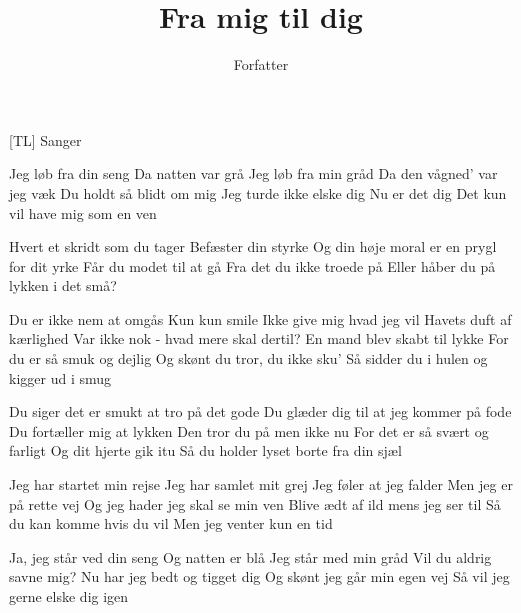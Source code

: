 \documentclass[a4paper,11pt]{article}
\title{Fra mig til dig}
\author{Forfatter}
\begin{document}
\maketitle

\begin{roles}
[TL] Sanger
\end{roles}

\begin{song}

 Jeg løb fra din seng
  Da natten var grå
  Jeg løb fra min gråd
  Da den vågned' var jeg væk
  Du holdt så blidt om mig
  Jeg turde ikke elske dig
  Nu er det dig
  Det kun vil have mig som en ven

 Hvert et skridt som du tager
  Befæster din styrke
  Og din høje moral er en prygl for dit yrke
  Får du modet til at gå
  Fra det du ikke troede på
  Eller håber du på lykken i det små?

 Du er ikke nem at omgås
  Kun kun smile
  Ikke give mig hvad jeg vil
  Havets duft af kærlighed
  Var ikke nok - hvad mere skal dertil?
  En mand blev skabt til lykke
  For du er så smuk og dejlig
  Og skønt du tror, du ikke sku'
  Så sidder du i hulen og kigger ud i smug

 Du siger det er smukt at tro på det gode
  Du glæder dig til at jeg kommer på fode
  Du fortæller mig at lykken
  Den tror du på men ikke nu
  For det er så svært og farligt
  Og dit hjerte gik itu
  Så du holder lyset borte fra din sjæl

 Jeg har startet min rejse
  Jeg har samlet mit grej
  Jeg føler at jeg falder
  Men jeg er på rette vej
  Og jeg hader jeg skal se min ven
  Blive ædt af ild mens jeg ser til
  Så du kan komme hvis du vil
  Men jeg venter kun en tid

 Ja, jeg står ved din seng
  Og natten er blå
  Jeg står med min gråd
  Vil du aldrig savne mig?
  Nu har jeg bedt og tigget dig
  Og skønt jeg går min egen vej
  Så vil jeg gerne elske dig igen

\end{song}
\end{document}
